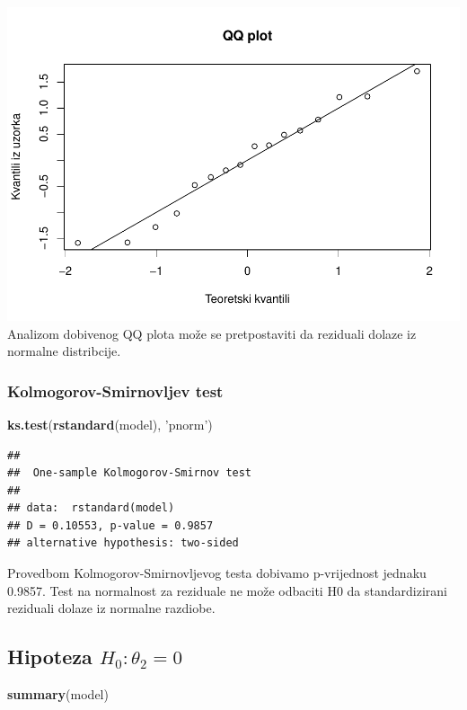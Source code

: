 \documentclass[]{article}
\newenvironment{Shaded}{\begin{snugshade}}{\end{snugshade}}
\newcommand{\KeywordTok}[1]{\textcolor[rgb]{0.13,0.29,0.53}{\textbf{{#1}}}}
\newcommand{\StringTok}[1]{\textcolor[rgb]{0.31,0.60,0.02}{{#1}}}
\newcommand{\NormalTok}[1]{{#1}}
\begin{document}
\includegraphics{Izvjestaj_files/figure-latex/unnamed-chunk-20-1.pdf}
Analizom dobivenog QQ plota može se pretpostaviti da reziduali dolaze iz
normalne distribcije.

\subsubsection{Kolmogorov-Smirnovljev
test}\label{kolmogorov-smirnovljev-test-2}

\begin{Shaded}
\begin{Highlighting}[]
\KeywordTok{ks.test}\NormalTok{(}\KeywordTok{rstandard}\NormalTok{(model), }\StringTok{'pnorm'}\NormalTok{)}
\end{Highlighting}
\end{Shaded}

\begin{verbatim}
## 
##  One-sample Kolmogorov-Smirnov test
## 
## data:  rstandard(model)
## D = 0.10553, p-value = 0.9857
## alternative hypothesis: two-sided
\end{verbatim}

Provedbom Kolmogorov-Smirnovljevog testa dobivamo p-vrijednost jednaku
0.9857. Test na normalnost za reziduale ne može odbaciti H0 da
standardizirani reziduali dolaze iz normalne razdiobe.

\subsection{\texorpdfstring{Hipoteza
\(H_0 : \theta_2 = 0\)}{Hipoteza H\_0 : \textbackslash{}theta\_2 = 0}}\label{hipoteza-h_0-theta_2-0}

\begin{Shaded}
\begin{Highlighting}[]
\KeywordTok{summary}\NormalTok{(model)}
\end{Highlighting}
\end{Shaded}
\end{document}
